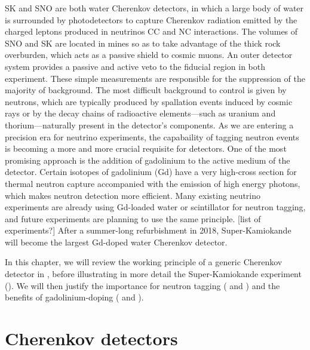 SK and SNO are both water Cherenkov detectors, in which a large body of water is surrounded by %
photodetectors to capture Cherenkov radiation emitted by the charged leptons produced in neutrinos CC and NC interactions.
The volumes of SNO and SK are located in mines so as to take advantage of the thick rock overburden, %
which acts as a passive shield to cosmic muons.
An outer detector system provides a passive and active veto to the fiducial region in both experiment.
These simple measurements are responsible for the suppression of the majority of background.
The most difficult background to control is given by neutrons, which are typically produced by spallation events %
induced by cosmic rays or by the decay chains of radioactive elements---such as uranium and thorium---naturally %
present in the detector's components.
As we are entering a precision era for neutrino experiments, the capabaility of tagging neutron %
events is becoming a more and more crucial requisite for detectors.
One of the most promising approach is the addition of gadolinium to the active medium of the detector.
Certain isotopes of gadolinium (Gd) have a very high-cross section for thermal neutron capture %
accompanied with the emission of high energy photons, which makes neutron detection more efficient.
Many existing neutrino experiments are already using Gd-loaded water or scintillator for neutron tagging, %
and future experiments are planning to use the same principle. [list of experiments?]
After a summer-long refurbishment in 2018, Super-Kamiokande will become the largest Gd-doped water Cherenkov detector.

In this chapter, we will review the working principle of a generic Cherenkov detector in , %
before illustrating in more detail the Super-Kamiokande experiment ().
We will then justify the importance for neutron tagging ( and ) %
and the benefits of gadolinium-doping ( and ).

\section{Cherenkov detectors}
\label{sec:wch}


